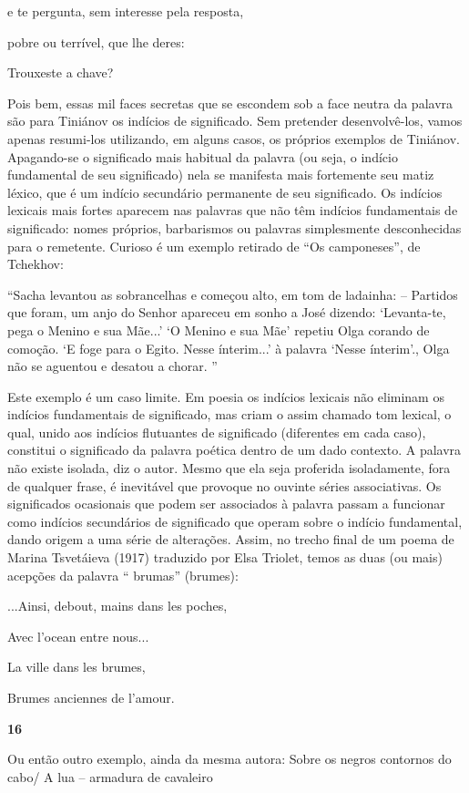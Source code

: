 e te pergunta, sem interesse pela resposta,

pobre ou terrível, que lhe deres:

Trouxeste a chave?

Pois bem, essas mil faces secretas que se escondem sob a face neutra da
palavra são para Tiniánov os indícios de significado. Sem pretender
desenvolvê-los, vamos apenas resumi-los utilizando, em alguns casos, os
próprios exemplos de Tiniánov. Apagando-se o significado mais habitual
da palavra (ou seja, o indício fundamental de seu significado) nela se
manifesta mais fortemente seu matiz léxico, que é um indício secundário
permanente de seu significado. Os indícios lexicais mais fortes aparecem
nas palavras que não têm indícios fundamentais de significado: nomes
próprios, barbarismos ou palavras simplesmente desconhecidas para o
remetente. Curioso é um exemplo retirado de ``Os camponeses'', de
Tchekhov:

``Sacha levantou as sobrancelhas e começou alto, em tom de ladainha: --
Partidos que foram, um anjo do Senhor apareceu em sonho a José dizendo:
`Levanta-te, pega o Menino e sua Mãe...' `O Menino e sua Mãe' repetiu
Olga corando de comoção. `E foge para o Egito. Nesse ínterim...' à
palavra `Nesse ínterim'., Olga não se aguentou e desatou a chorar. ''

Este exemplo é um caso limite. Em poesia os indícios lexicais não
eliminam os indícios fundamentais de significado, mas criam o assim
chamado tom lexical, o qual, unido aos indícios flutuantes de
significado (diferentes em cada caso), constitui o significado da
palavra poética dentro de um dado contexto. A palavra não existe
isolada, diz o autor. Mesmo que ela seja proferida isoladamente, fora de
qualquer frase, é inevitável que provoque no ouvinte séries
associativas. Os significados ocasionais que podem ser associados à
palavra passam a funcionar como indícios secundários de significado que
operam sobre o indício fundamental, dando origem a uma série de
alterações. Assim, no trecho final de um poema de Marina Tsvetáieva
(1917) traduzido por Elsa Triolet, temos as duas (ou mais) acepções da
palavra `` brumas'' (brumes):

...Ainsi, debout, mains dans les poches,

Avec l'ocean entre nous...

La ville dans les brumes,

Brumes anciennes de l'amour.

\textbf{16}

Ou então outro exemplo, ainda da mesma autora: Sobre os negros contornos
do cabo/ A lua -- armadura de cavaleiro

